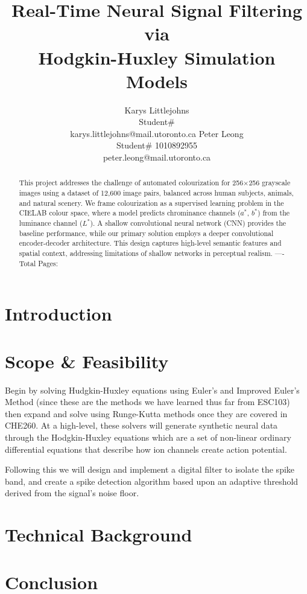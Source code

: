 \documentclass{article} %
\title{Real-Time Neural Signal Filtering via \\
Hodgkin-Huxley Simulation Models}
\author{Karys Littlejohns\\
Student\# \\
karys.littlejohns@mail.utoronto.ca
\And
Peter Leong \\
Student\# 1010892955 \\
peter.leong@mail.utoronto.ca \\
\AND
}
\begin{document}
\maketitle

\vspace{-6ex}

\begin{abstract}
This project addresses the challenge of automated colourization for 256$\times$256 grayscale images using a dataset of 12,600 image pairs, balanced across human subjects, 
animals, and natural scenery. We frame colourization as a supervised learning problem in the CIELAB colour space, where a model predicts chrominance channels ($a^*$, $b^*$) 
from the luminance channel ($L^*$). A shallow convolutional neural network (CNN) provides the baseline performance, while our primary solution employs a deeper convolutional 
encoder-decoder architecture. This design captures high-level semantic features and spatial context, addressing limitations of shallow networks in perceptual realism.
----Total Pages: \pageref{last_page}
\end{abstract}

\vspace{2ex}

\begin{multicols}{2}

\section{Introduction}

\section{Scope \& Feasibility}

Begin by solving Hudgkin-Huxley equations using Euler's and Improved Euler's Method (since these are the methods we have learned thus far from ESC103)
then expand and solve using Runge-Kutta methods once they are covered in CHE260. At a high-level, these solvers will generate synthetic neural data through
the Hodgkin-Huxley equations which are a set of non-linear ordinary differential equations that describe how ion channels create action potential.

Following this we will design and implement a digital filter to isolate the spike band, and create a spike detection algorithm based upon an adaptive threshold
derived from the signal's noise floor.

\section{Technical Background}

\section{Conclusion}

\label{last_page}

\newpage



\end{multicols}
\end{document}
